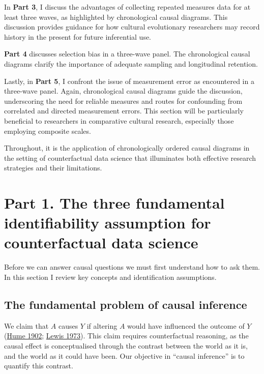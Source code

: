 \documentclass[
  singlecolumn]{report}
\begin{document}
In \textbf{Part 3}, I discuss the advantages of collecting repeated
measures data for at least three waves, as highlighted by chronological
causal diagrams. This discussion provides guidance for how cultural
evolutionary researchers may record history in the present for future
inferential use.

\textbf{Part 4} discusses selection bias in a three-wave panel. The
chronological causal diagrams clarify the importance of adequate
sampling and longitudinal retention.

Lastly, in \textbf{Part 5}, I confront the issue of measurement error as
encountered in a three-wave panel. Again, chronological causal diagrams
guide the discussion, underscoring the need for reliable measures and
routes for confounding from correlated and directed measurement errors.
This section will be particularly beneficial to researchers in
comparative cultural research, especially those employing composite
scales.

Throughout, it is the application of chronologically ordered causal
diagrams in the setting of counterfactual data science that illuminates
both effective research strategies and their limitations.

\hypertarget{part-1.-the-three-fundamental-identifiability-assumption-for-counterfactual-data-science}{%
\section{Part 1. The three fundamental identifiability assumption for
counterfactual data
science}\label{part-1.-the-three-fundamental-identifiability-assumption-for-counterfactual-data-science}}

Before we can answer causal questions we must first understand how to
ask them. In this section I review key concepts and identification
assumptions.

\hypertarget{the-fundamental-problem-of-causal-inference}{%
\subsection{The fundamental problem of causal
inference}\label{the-fundamental-problem-of-causal-inference}}

We claim that \(A\) causes \(Y\) if altering \(A\) would have influenced
the outcome of \(Y\) (\protect\hyperlink{ref-hume1902}{Hume 1902};
\protect\hyperlink{ref-lewis1973}{Lewis 1973}). This claim requires
counterfactual reasoning, as the causal effect is conceptualised through
the contrast between the world as it is, and the world as it could have
been. Our objective in ``causal inference'' is to quantify this
contrast.
\end{document}

